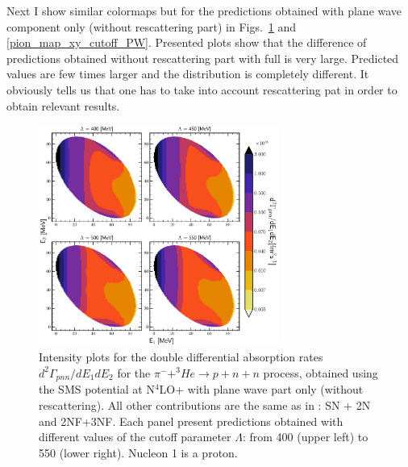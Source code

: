     Next I show similar colormaps but for the predictions obtained with plane wave component only (without rescattering part)
    in Figs.~\ref{pion_map_E1E2_cutoff_PW} and \ref{pion_map_xy_cutoff_PW}. Presented plots show that
    the difference of predictions obtained without rescattering part with full is very large. Predicted values 
    are few times larger and the distribution is completely different. It obviously tells us that
    one has to take into account rescattering pat in order to obtain relevant results.   

    \begin{figure}[h]
        \begin{center}
        \includegraphics[width=0.7\textwidth]{PlotData/PION/Dalitz_maps/figures/Dalitz_map_pnn_E1E2_cutofs_PWIAS.pdf}
        \end{center}
        \caption{Intensity plots for the double differential absorption rates
        $d^2 \Gamma_{pnn}/dE_1dE_2$ for the $\pi^- + ^3He \rightarrow p + n + n$
        process, obtained using the SMS potential at N$^4$LO+
        with plane wave part only (without rescattering).
        All other contributions are the same as in : SN + 2N and 2NF+3NF.
        Each panel present predictions obtained with different values of the cutoff parameter $\Lambda$:
        from \SI{400}{\mev} (upper left) to \SI{550}{\mev} (lower right). Nucleon 1 is a proton.}
        \label{pion_map_E1E2_cutoff_PW}
    \end{figure}

